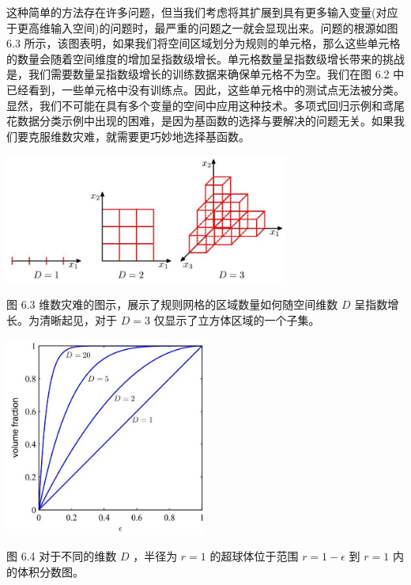 \documentclass[10pt]{article}
\begin{document}
这种简单的方法存在许多问题，但当我们考虑将其扩展到具有更多输入变量(对应于更高维输入空间)的问题时，最严重的问题之一就会显现出来。问题的根源如图 6.3 所示，该图表明，如果我们将空间区域划分为规则的单元格，那么这些单元格的数量会随着空间维度的增加呈指数级增长。单元格数量呈指数级增长带来的挑战是，我们需要数量呈指数级增长的训练数据来确保单元格不为空。我们在图 6.2 中已经看到，一些单元格中没有训练点。因此，这些单元格中的测试点无法被分类。显然，我们不可能在具有多个变量的空间中应用这种技术。多项式回归示例和鸢尾花数据分类示例中出现的困难，是因为基函数的选择与要解决的问题无关。如果我们要克服维数灾难，就需要更巧妙地选择基函数。

\begin{center}
\includegraphics[max width=0.7\textwidth]{images/0194e279-9b28-703a-88f4-c3ac21e2010d_193_657_1598_878_399_0.jpg}
\end{center}
\hspace*{3em} 

图 6.3 维数灾难的图示，展示了规则网格的区域数量如何随空间维数 \(D\) 呈指数增长。为清晰起见，对于 \(D = 3\) 仅显示了立方体区域的一个子集。

\begin{center}
\includegraphics[max width=0.5\textwidth]{images/0194e279-9b28-703a-88f4-c3ac21e2010d_194_931_346_617_603_0.jpg}
\end{center}
\hspace*{3em} 

图 6.4 对于不同的维数 \(D\) ，半径为 \(r = 1\) 的超球体位于范围 \(r = 1 - \epsilon\) 到 \(r = 1\) 内的体积分数图。
\end{document}
